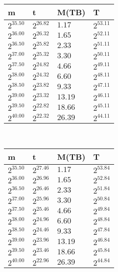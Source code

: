  \ 
\begin{tabular}{llll}
m & t & M(TB) & T \\ \hline
$2^{35.50}$ & $2^{26.82}$ & $1.17$ & $2^{53.11}$ \\
$2^{36.00}$ & $2^{26.32}$ & $1.65$ & $2^{52.11}$ \\
$2^{36.50}$ & $2^{25.82}$ & $2.33$ & $2^{51.11}$ \\
$2^{37.00}$ & $2^{25.32}$ & $3.30$ & $2^{50.11}$ \\
$2^{37.50}$ & $2^{24.82}$ & $4.66$ & $2^{49.11}$ \\
$2^{38.00}$ & $2^{24.32}$ & $6.60$ & $2^{48.11}$ \\
$2^{38.50}$ & $2^{23.82}$ & $9.33$ & $2^{47.11}$ \\
$2^{39.00}$ & $2^{23.32}$ & $13.19$ & $2^{46.11}$ \\
$2^{39.50}$ & $2^{22.82}$ & $18.66$ & $2^{45.11}$ \\
$2^{40.00}$ & $2^{22.32}$ & $26.39$ & $2^{44.11}$ \\
\end{tabular}
 \ 
\begin{tabular}{llll}
m & t & M(TB) & T \\ \hline
$2^{35.50}$ & $2^{27.46}$ & $1.17$ & $2^{53.84}$ \\
$2^{36.00}$ & $2^{26.96}$ & $1.65$ & $2^{52.84}$ \\
$2^{36.50}$ & $2^{26.46}$ & $2.33$ & $2^{51.84}$ \\
$2^{37.00}$ & $2^{25.96}$ & $3.30$ & $2^{50.84}$ \\
$2^{37.50}$ & $2^{25.46}$ & $4.66$ & $2^{49.84}$ \\
$2^{38.00}$ & $2^{24.96}$ & $6.60$ & $2^{48.84}$ \\
$2^{38.50}$ & $2^{24.46}$ & $9.33$ & $2^{47.84}$ \\
$2^{39.00}$ & $2^{23.96}$ & $13.19$ & $2^{46.84}$ \\
$2^{39.50}$ & $2^{23.46}$ & $18.66$ & $2^{45.84}$ \\
$2^{40.00}$ & $2^{22.96}$ & $26.39$ & $2^{44.84}$ \\
\end{tabular}
 \ 
